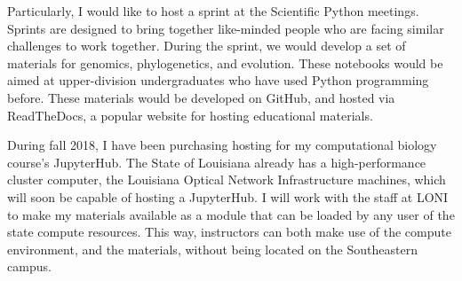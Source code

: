 \documentclass[]{article}
\begin{document}
Particularly, I would like to host a sprint at the Scientific Python meetings.
Sprints are designed to bring together like-minded people who are facing similar challenges to work together.
During the sprint, we would develop a set of materials for genomics, phylogenetics, and evolution.
These notebooks would be aimed at upper-division undergraduates who have used Python programming before.  
These materials would be developed on GitHub, and hosted via ReadTheDocs, a popular website for hosting educational materials. \par
During fall 2018, I have been purchasing hosting for my computational biology course's JupyterHub.
The State of Louisiana already has a high-performance cluster computer, the Louisiana Optical Network Infrastructure machines, which will soon be capable of hosting a JupyterHub.
I will work with the staff at LONI to make my materials available as a module that can be loaded by any user of the state compute resources.
This way, instructors can both make use of the compute environment, and the materials, without being located on the Southeastern campus. \par
\end{document}
